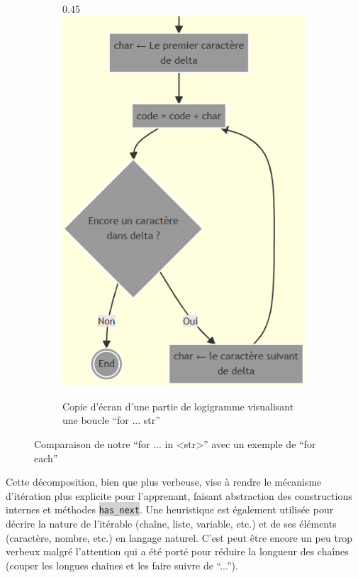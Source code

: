 \documentclass[11pt,a4paper]{article}
\newcommand{\code}[1]{\colorbox{lightgray}{\texttt{\small #1}}}
\begin{document}
\begin{figure}[H]
\begin{subfigure}{t}{0.45\textwidth}
        \centering
        \includegraphics[width=\linewidth, keepaspectratio]{for_str_screenshot.png}
        \caption{Copie d'écran d'une partie de logigramme visualisant une boucle ``for ... str''}
        \label{fig:for_str_screenshot}
    \end{subfigure}
    \caption{Comparaison de notre ``for ... in <str>'' avec un exemple de ``for each''}
    \label{fig:deux_for}
\end{figure}

Cette décomposition, bien que plus verbeuse, vise à rendre le mécanisme d'itération plus explicite pour l'apprenant, faisant abstraction des constructions internes et méthodes \code{has_next}. Une heuristique est également utilisée pour décrire la nature de l'itérable (chaîne, liste, variable, etc.) et 
de ses éléments (caractère, nombre, etc.) en langage naturel. C'est peut être encore un peu trop verbeux malgré l'attention qui a été porté pour réduire la longueur des chaînes (couper les longues chaines et les faire suivre de ``...'').
\end{document}
